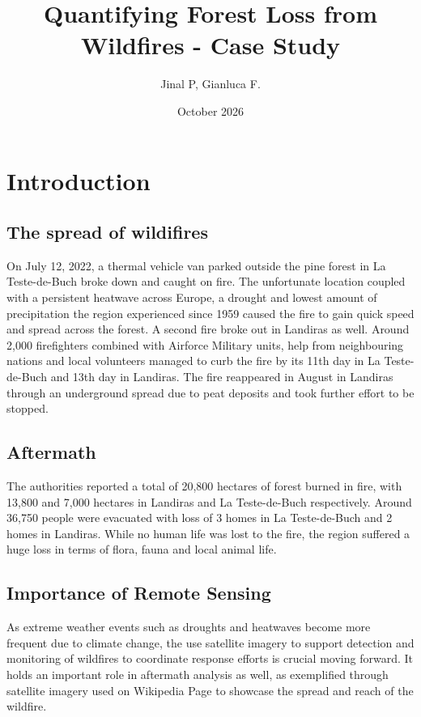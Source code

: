 \documentclass{article}
\title{Quantifying Forest Loss from Wildfires - Case Study}
\author{Jinal P, Gianluca F.}
\date{October 2026}
\begin{document}
\maketitle

\section{Introduction}

\subsection{The spread of wildifires}
On July 12, 2022, a thermal vehicle van parked outside the pine forest in La Teste-de-Buch broke down and caught on fire. The unfortunate location coupled with a persistent heatwave across Europe, a drought and lowest amount of precipitation the region experienced since 1959  caused the fire to gain quick speed and spread across the forest.  A second fire broke out in Landiras as well. Around 2,000 firefighters combined with Airforce Military units, help from neighbouring nations and local volunteers managed to curb the fire by its 11th day in La Teste-de-Buch and 13th day in Landiras. The fire reappeared in August in Landiras through an underground spread due to peat deposits and took further effort to be stopped. 

\subsection{Aftermath}
The authorities reported a total of 20,800 hectares of forest burned in fire, with 13,800 and 7,000 hectares in Landiras and La Teste-de-Buch respectively.  Around 36,750 people were evacuated with loss of 3 homes in La Teste-de-Buch and 2 homes in Landiras. While no human life was lost to the fire, the region suffered a huge loss in terms of flora, fauna and local animal life.

\subsection{Importance of Remote Sensing}
As extreme weather events such as droughts and heatwaves become more frequent due to climate change, the use satellite imagery to support detection and monitoring of wildfires to coordinate response efforts is crucial moving forward. It holds an important role in aftermath analysis as well, as exemplified through satellite imagery used on Wikipedia Page to showcase the spread and reach of the wildfire.
\end{document}
